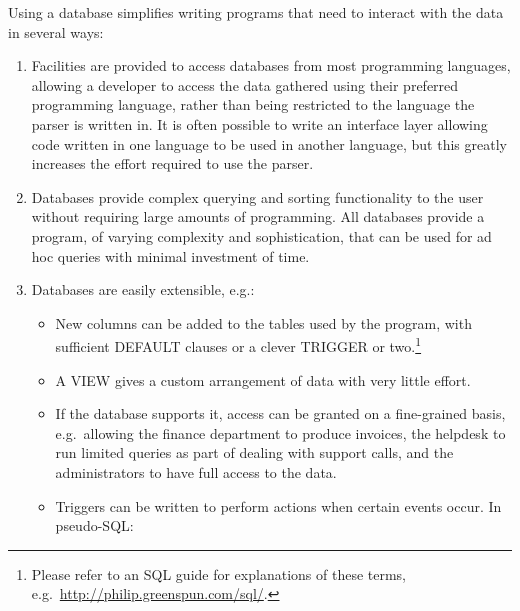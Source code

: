 Using a database simplifies writing programs that need to interact with the
data in several ways:

\begin{enumerate}

    \item Facilities are provided to access databases from most programming
        languages, allowing a developer to access the data gathered using
        their preferred programming language, rather than being restricted
        to the language the parser is written in.  It is often possible to
        write an interface layer allowing code written in one language to
        be used in another language, but this greatly increases the effort
        required to use the parser.

    \item Databases provide complex querying and sorting functionality to
        the user without requiring large amounts of programming.  All
        databases provide a program, of varying complexity and
        sophistication, that can be used for ad hoc queries with minimal
        investment of time.

    \item Databases are easily extensible, e.g.:

        \begin{itemize}

            \item New columns can be added to the tables used by the
                program, with sufficient DEFAULT clauses or a clever
                TRIGGER or two.\footnote{Please refer to an \gls{SQL} guide
                for explanations of these terms, e.g.\
                \url{http://philip.greenspun.com/sql/}.}

            \item A VIEW gives a custom arrangement of data with very
                little effort.

            \item If the database supports it, access can be granted on a
                fine-grained basis, e.g.\ allowing the finance department
                to produce invoices, the helpdesk to run limited queries as
                part of dealing with support calls, and the administrators
                to have full access to the data.

            \item Triggers can be written to perform actions when certain
                events occur.  In pseudo-\gls{SQL}\@:


\end{itemize}
\end{enumerate}
